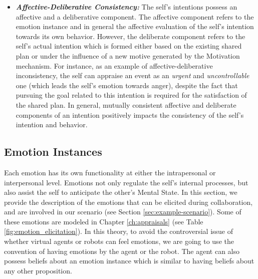 \documentclass[12pt]{report}
\begin{document}
\begin{itemize}
  \item \textbf{\textit{Affective-Deliberative Consistency:}} The self's
  intentions possess an affective and a deliberative component. The affective
  component refers to the emotion instance and in general the affective
  evaluation of the self's intention towards its own behavior. However, the
  deliberate component refers to the self's actual intention which is formed
  either based on the existing shared plan or under the influence of a new
  motive generated by the Motivation mechanism. For instance, as an example of
  affective-deliberative inconsistency, the self can appraise an event as an
  \textit{urgent} and \textit{uncontrollable} one (which leads the self's
  emotion towards anger), despite the fact that pursuing the goal related
  to this intention is required for the satisfaction of the shared plan. In
  general, mutually consistent affective and deliberate components of an
  intention positively impacts the consistency of the self's intention and
  behavior.
\end{itemize}

\subsection{Emotion Instances}
\label{section-emotion-instances}

Each emotion has its own functionality at either the intrapersonal or
interpersonal level. Emotions not only regulate the self's internal processes,
but also assist the self to anticipate the other's Mental State. In this
section, we provide the description of the emotions that can be elicited
during collaboration, and are involved in our scenario (see Section
\ref{sec:example-scenario}). Some of these emotions are modeled in
Chapter \ref{ch:appraisals} (see Table \ref{fig:emotion_elicitation}). In this
theory, to avoid the controversial issue of whether virtual agents or robots can
feel emotions, we are going to use the convention of having emotions by the
agent or the robot. The agent can also possess beliefs about an emotion instance
which is similar to having beliefs about any other proposition.
\end{document}

